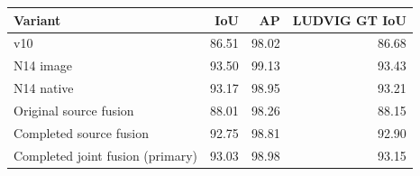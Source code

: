 \begin{tabular}{lrrr}
\toprule
Variant & IoU & AP & LUDVIG GT IoU \\\midrule
v10 & 86.51 & 98.02 & 86.68 \\
N14 image & 93.50 & 99.13 & 93.43 \\
N14 native & 93.17 & 98.95 & 93.21 \\
Original source fusion & 88.01 & 98.26 & 88.15 \\
Completed source fusion & 92.75 & 98.81 & 92.90 \\
Completed joint fusion (primary) & 93.03 & 98.98 & 93.15 \\
\bottomrule
\end{tabular}
